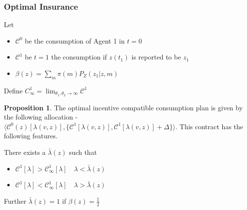 \documentclass{beamer}
\theoremstyle{definition}
\newtheorem{proposition}{Proposition}%
\begin{document}
\begin{frame}
\frametitle{Optimal Insurance}
Let 

\begin{itemize}
	\item $\mathcal{C}^0$ be the consumption of Agent 1 in $t=0$
\item  $\mathcal{C}^1$ be $t=1$ the consumption if $z(t_1)$ is reported to be $z_1$
\item $\beta(z)=\sum_{m}{\pi(m)P_Z(z_1|z,m)}$ 

\end{itemize}
Define $C^1_{\infty} = \lim_{\theta_1,\theta_2 \to \infty} \mathcal{C}^1$ 

\begin{proposition}
The optimal incentive compatible consumption plan is given by the following allocation - $\langle \mathcal{C}^0(z)[\lambda(v,z)],\{\mathcal{C}^{1}[\lambda(v,z)],\mathcal{C}^{1}[\lambda(v,z)]+\Delta\}\rangle$. This contract has the following features.

There exists a $\bar{\lambda}(z)$ such that 
\begin{itemize}
	\item $\mathcal{C}^{1}[\lambda] > \mathcal{C}^{1}_{\infty}[\lambda] \quad \lambda < \bar{\lambda}(z)$
	\item $\mathcal{C}^{1}[\lambda] < \mathcal{C}^{1}_{\infty}[\lambda] \quad \lambda > \bar{\lambda}(z)$
\end{itemize}

Further $\bar{\lambda}(z)=1$ if $\beta(z)=\frac{1}{2}$
\end{proposition}

\end{frame}
\end{document}
